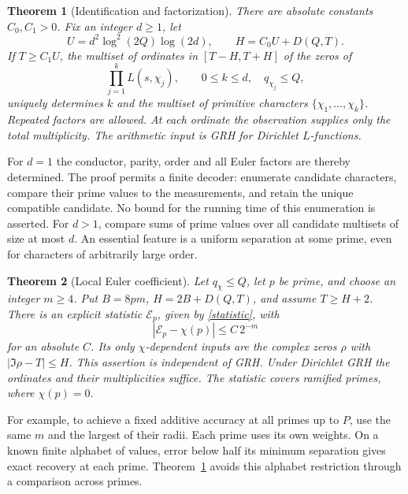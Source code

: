 \documentclass[11pt]{article}
\newtheorem{theorem}{Theorem}
\begin{document}
\begin{theorem}[Identification and factorization]\label{th:id}
There are absolute constants $C_0,C_1>0$. Fix an integer $d\ge1$, let
\[
 U=d^2\log^2(2Q)\log(2d),\qquad H=C_0 U+D(Q,T).
\]
If $T\ge C_1 U$, the multiset of ordinates in $[T-H,T+H]$ of the zeros of
\[
                  \prod_{j=1}^k L(s,\chi_j),\qquad 0\le k\le d,\quad q_{\chi_j}\le Q,
\]
uniquely determines $k$ and the multiset of primitive characters $\{\chi_1,\ldots,\chi_k\}$. Repeated factors are allowed. At each ordinate the observation supplies only the total multiplicity. The arithmetic input is GRH for Dirichlet $L$-functions.
\end{theorem}

For $d=1$ the conductor, parity, order and all Euler factors are thereby determined. The proof permits a finite decoder: enumerate candidate characters, compare their prime values to the measurements, and retain the unique compatible candidate. No bound for the running time of this enumeration is asserted. For $d>1$, compare sums of prime values over all candidate multisets of size at most $d$. An essential feature is a uniform separation at some prime, even for characters of arbitrarily large order.

\begin{theorem}[Local Euler coefficient]\label{th:coeff}
Let $q_\chi\le Q$, let $p$ be prime, and choose an integer $m\ge4$. Put $B=8pm$, $H=2B+D(Q,T)$, and assume $T\ge H+2$. There is an explicit statistic $\mathcal E_p$, given by \eqref{statistic}, with
\[
                  |\mathcal E_p-\chi(p)|\le C\,2^{-m}
\]
for an absolute $C$. Its only $\chi$-dependent inputs are the complex zeros $\rho$ with $|\Im\rho-T|\le H$. This assertion is independent of GRH. Under Dirichlet GRH the ordinates and their multiplicities suffice. The statistic covers ramified primes, where $\chi(p)=0$.
\end{theorem}

For example, to achieve a fixed additive accuracy at all primes up to $P$, use the same $m$ and the largest of their radii. Each prime uses its own weights. On a known finite alphabet of values, error below half its minimum separation gives exact recovery at each prime. Theorem~\ref{th:id} avoids this alphabet restriction through a comparison across primes.
\end{document}
